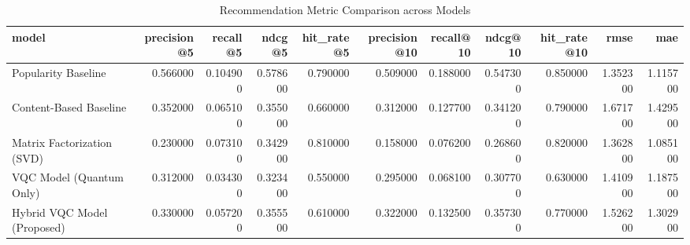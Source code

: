 \begin{table}
\caption{Recommendation Metric Comparison across Models}
\label{tab:metrics}
\begin{tabular}{lrrrrrrrrrr}
\toprule
model & precision@5 & recall@5 & ndcg@5 & hit_rate@5 & precision@10 & recall@10 & ndcg@10 & hit_rate@10 & rmse & mae \\
\midrule
Popularity Baseline & 0.566000 & 0.104900 & 0.578600 & 0.790000 & 0.509000 & 0.188000 & 0.547300 & 0.850000 & 1.352300 & 1.115700 \\
Content-Based Baseline & 0.352000 & 0.065100 & 0.355000 & 0.660000 & 0.312000 & 0.127700 & 0.341200 & 0.790000 & 1.671700 & 1.429500 \\
Matrix Factorization (SVD) & 0.230000 & 0.073100 & 0.342900 & 0.810000 & 0.158000 & 0.076200 & 0.268600 & 0.820000 & 1.362800 & 1.085100 \\
VQC Model (Quantum Only) & 0.312000 & 0.034300 & 0.323400 & 0.550000 & 0.295000 & 0.068100 & 0.307700 & 0.630000 & 1.410900 & 1.187500 \\
Hybrid VQC Model (Proposed) & 0.330000 & 0.057200 & 0.355500 & 0.610000 & 0.322000 & 0.132500 & 0.357300 & 0.770000 & 1.526200 & 1.302900 \\
\bottomrule
\end{tabular}
\end{table}
